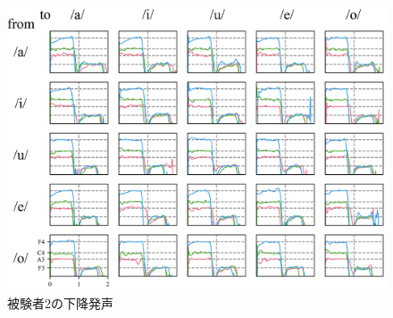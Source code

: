 \documentclass[10.5ptj,a4j,dvipdfmx,uplatex, oneside, openany, report]{jsbook}%
\begin{document}
\begin{figure}[htbp]
    \begin{center}
      \includegraphics[clip,width=12.0cm]{down2.png}
      \caption{被験者2の下降発声}
      \label{fig:d2}
    \end{center}
\end{figure}
\end{document}
